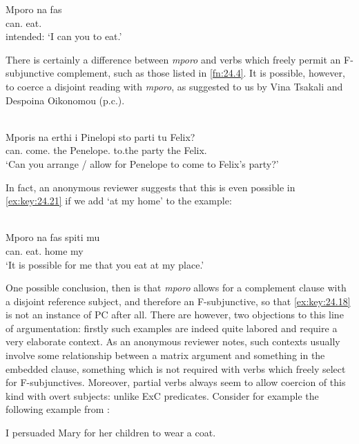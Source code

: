 \documentclass[output=paper]{langsci/langscibook}
\begin{document}
\ea%
    \label{ex:key:24.19} 
	\gll \llap{*}Mporo   na   fas\\
        can.\Fsg{}  \Sbjv{}   eat.\Ssg{}\\
    \glt intended: ‘I can you to eat.’
\z

There is certainly a difference between \emph{mporo} and verbs which freely
permit an F-subjunctive complement, such as those listed in \cref{fn:24.4}. It
is possible, however, to coerce a disjoint reading with \emph{mporo}, as
suggested to us by Vina Tsakali and Despoina Oikonomou (p.c.).

\ea%
    \label{ex:key:24.20}\\
	\gll Mporis  na   erthi     i Pinelopi     sto   parti   tu  Felix?\\
		can.\Ssg{} \Sbjv{}   come.\Tsg{}   the Penelope.\Nom{}      to.the   party   the Felix.\Gen{}\\
	\glt ‘Can you arrange / allow for Penelope to come to Felix’s party?’
\z

In fact, an anonymous reviewer suggests that this is even possible in
\eqref{ex:key:24.21} if we add ‘at my home’ to the example:

\ea%
    \label{ex:key:24.21}\\
	\gll Mporo   na   fas   spiti mu\\
    can.\Fsg{}   \Sbjv{}   eat.\Ssg{}  home my\\
	\glt ‘It is possible for me that you eat at my place.’
\z

One possible conclusion, then is that \emph{mporo} allows for a complement
clause with a disjoint reference subject, and therefore an F-subjunctive, so
that \eqref{ex:key:24.18} is not an instance of \gls{PC} after all.
There are however, two objections to this line of argumentation: firstly such
examples are indeed quite labored and require a very elaborate context. As an
anonymous reviewer notes, such contexts usually involve some relationship
between a matrix argument and something in the embedded clause, something which
is not required with verbs which freely select for F-subjunctives. Moreover,
partial  verbs always seem to allow coercion of this kind with overt
subjects: unlike \gls{ExC} predicates. Consider
for example the following example from :

\ea%
    \label{ex:key:24.22}
    I persuaded Mary for her children to wear a coat.
\z
\end{document}
